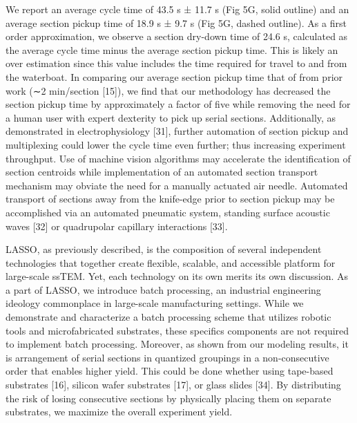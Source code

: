 \documentclass{article}
\begin{document}
We report an average cycle time of 43.5 s ± 11.7 s (Fig 5G, solid outline) and an average section pickup time of 18.9 s ± 9.7 s (Fig 5G, dashed outline). As a first order approximation, we observe a section dry-down time of 24.6 s, calculated as the average cycle time minus the average section pickup time. This is likely an over estimation since this value includes the time required for travel to and from the waterboat. In comparing our average section pickup time that of from prior work (∼2 min/section [15]), we find that our methodology has decreased the section pickup time by approximately a factor of five while removing the need for a human user with expert dexterity to pick up serial sections. Additionally, as demonstrated in electrophysiology [31], further automation of section pickup and multiplexing could lower the cycle time even further; thus increasing experiment throughput. Use of machine vision algorithms may accelerate the identification of section centroids while implementation of an automated section transport mechanism may obviate the need for a manually actuated air needle. Automated transport of sections away from the knife-edge prior to section pickup may be accomplished via an automated pneumatic system, standing surface acoustic waves [32] or quadrupolar capillary interactions [33].

LASSO, as previously described, is the composition of several independent technologies that together create flexible, scalable, and accessible platform for large-scale ssTEM. Yet, each technology on its own merits its own discussion. As a part of LASSO, we introduce batch processing, an industrial engineering ideology commonplace in large-scale manufacturing settings. While we demonstrate and characterize a batch processing scheme that utilizes robotic tools and microfabricated substrates, these specifics components are not required to implement batch processing. Moreover, as shown from our modeling results, it is arrangement of serial sections in quantized groupings in a non-consecutive order that enables higher yield. This could be done whether using tape-based substrates [16], silicon wafer substrates [17], or glass slides [34]. By distributing the risk of losing consecutive sections by physically placing them on separate substrates, we maximize the overall experiment yield.
\end{document}
